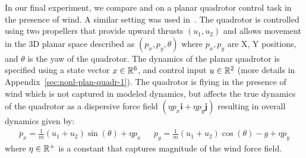 In our final experiment, we compare \MM{} and \ILC{} on a planar quadrotor control
task in the presence of wind. A similar setting was used
in~\cite{DBLP:conf/icml/AgarwalHMS21}. The quadrotor is controlled using two propellers
that provide upward
thrusts $(u_{1}, u_{2})$ and allows movement in the $3$D planar space
described as
$(p_{x}, p_{y}, \theta)$ where $p_{x}, p_{y}$ are X, Y positions, and
$\theta$ is the yaw of the quadrotor. The dynamics of the planar quadrotor
is specified
using a state vector $x \in \mathbb{R}^{6}$, and control input $u \in
\mathbb{R}^{2}$ (more details in Appendix~\ref{sec:nonl-plan-quadr-1}).
The quadrotor is flying in the presence of wind which is not captured in modeled
dynamics, but affects the true dynamics of the quadrotor as a dispersive force
field $(\eta p_{x}\mathbf{i} + \eta p_{y} \mathbf{j})$ resulting in
overall dynamics given by:
\begin{align*}
  \ddot{p}_{x} = \frac{1}{m}(u_{1} + u_{2})\sin(\theta) + \eta p_{x}~~~~~~~
  \ddot{p}_{y} = \frac{1}{m}(u_{1} + u_{2})\cos(\theta) - g + \eta p_{y}
\end{align*}
where $\eta \in \mathbb{R}^{+}$ is a constant that captures magnitude of the wind
force field.

